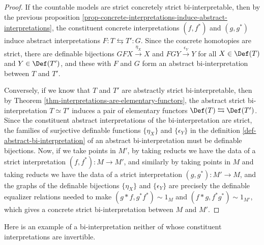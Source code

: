 
\begin{proof}If the countable models are strict concretely strict bi-interpretable, then by the previous proposition \ref{prop-concrete-interpretations-induce-abstract-interpretations}, the constituent concrete interpretations $(f, f^*)$ and $(g, g^*)$ induce abstract interpretations $F : T \leftrightarrows T': G$. Since the concrete homotopies are strict, there are definable bijections $GF X \overset{\eta_X}{\to} X$ and $FG Y \overset{\epsilon_Y}{\to} Y$ for all $X \in \Def(T)$ and $Y \in \Def(T')$, and these with $F$ and $G$ form an abstract bi-interpretation between $T$ and $T'$.

Conversely, if we know that $T$ and $T'$ are abstractly strict bi-interpretable, then by Theorem \ref{thm-interpretations-are-elementary-functors}, the abstract strict bi-interpretation $T \simeq T'$ induces a pair of elementary functors $\Def(T) \leftrightarrows \Def(T')$. Since the constituent abstract interpretations of the bi-interpretation are strict, the families of surjective definable functions $\{\eta_X\}$ and $\{\epsilon_Y\}$ in the definition \ref{def-abstract-bi-interpretation} of an abstract bi-interpretation must be definable bijections. Now, if we take points in $M'$, by taking reducts we have the data of a strict interpretation $(f, f^*) : M \to M'$, and similarly by taking points in $M$ and taking reducts we have the data of a strict interpretation $(g, g^*) : M' \to M$, and the graphs of the definable bijections $\{\eta_X\}$ and $\{\epsilon_Y\}$ are precisely the definable equalizer relations needed to make $(g * f, g^* f^*) \sim 1_M$ and $(f * g, f^* g^*) \sim 1_{M'}$, which gives a concrete strict bi-interpretation between $M$ and $M'$.
\end{proof}

Here is an example of a bi-interpretation neither of whose constituent interpretations are invertible.


